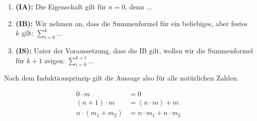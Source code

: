 \begin{framed}[\dq{}Induktionsschablone\dq{}]
  \begin{enumerate}
    \setlength{\itemsep}{-0.1cm}
    \item \textbf{(IA):} Die Eigenschaft gilt für $n = 0$, denn $\dots$
    \item \textbf{(IB):} Wir nehmen an, dass die Summenformel für ein beliebiges,
          aber festes $k$ gilt: $\sum_{i=0}^{k} \dots$
    \item \textbf{(IS):} Unter der Voraussetzung, dass die IB gilt, wollen wir 
          die Summenformel für $k + 1$ zeigen: $\sum_{i=0}^{k+1} \dots$
  \end{enumerate}
  Nach dem Induktionsprinzip gilt die Aussage also für alle natürlichen Zahlen.
\end{framed}

\begin{framed} 
  \begin{equation*}
    \begin{aligned}
      0 \cdot m &= 0\\
      (n + 1) \cdot m &= (n \cdot m) + m\\
      n \cdot (m_1 + m_2) &= n \cdot m_1 + n \cdot m_2
    \end{aligned}
  \end{equation*}
\end{framed}
